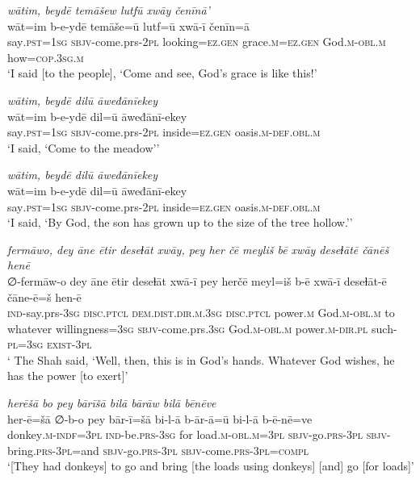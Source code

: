 \ea \label{ZQ.46}
\textit{wātim, beydē temāšew lutfū xwāy čenīnā’} \\ 
\gll wāt=im b-e-ydē temāše=ū lutf=ū xwā-ī čenīn=ā \\ 
 say\textsc{.pst}\textsc{=\textsc{1sg}} \textsc{sbjv-}come.prs-\textsc{2pl} looking\textsc{=ez.gen} grace\textsc{.m}\textsc{=ez.gen} God\textsc{.m}\textsc{-obl}\textsc{.m} how\textsc{=cop}\textsc{.3sg}\textsc{.m} \\ 
\glt `I said [to the people], ‘Come and see, God’s grace is like this!'
\z 
 
\ea \label{ZQ.48}
\textit{wātim, beydē dilū āweđānīekey} \\ 
\gll wāt=im b-e-ydē dil=ū āweđānī-ekey \\ 
 say\textsc{.pst}\textsc{=\textsc{1sg}} \textsc{sbjv-}come.prs-\textsc{2pl} inside\textsc{=ez.gen} oasis\textsc{.m}\textsc{-def}\textsc{.obl}\textsc{.m} \\ 
\glt `I said, ‘Come to the meadow’'
\z 
 
\ea \label{ZQ.50}
\textit{wātim, beydē dilū āweđānīekey} \\ 
\gll wāt=im b-e-ydē dil=ū āweđānī-ekey \\ 
 say\textsc{.pst}\textsc{=\textsc{1sg}} \textsc{sbjv-}come.prs-\textsc{2pl} inside\textsc{=ez.gen} oasis\textsc{.m}\textsc{-def}\textsc{.obl}\textsc{.m} \\ 
\glt `I said, ‘By God, the son has grown up to the size of the tree hollow.’'
\z 
 
\ea \label{ZQ.55}
\textit{fermāwo, dey āne ētir deseɫāt xwāy, pey her čē meyliš bē xwāy deseɫātē čānēš henē} \\ 
\gll ∅-fermāw-o dey āne ētir deseɫāt xwā-ī pey herčē meyl=iš b-ē xwā-ī deseɫāt-ē čāne-ē=š hen-ē \\ 
 \textsc{ind-}say.prs\textsc{-3sg} \textsc{disc.ptcl} \textsc{dem.dist}\textsc{.dir}\textsc{.m}\textsc{.3sg} \textsc{disc.ptcl} power\textsc{.m} God\textsc{.m}\textsc{-obl}\textsc{.m} to whatever willingness\textsc{=3sg} \textsc{sbjv-}come.prs\textsc{.3sg} God\textsc{.m}\textsc{-obl}\textsc{.m} power\textsc{.m-dir.pl} such\textsc{-pl}\textsc{=3sg} \textsc{exist}\textsc{-3pl} \\ 
\glt ` The Shah said, ‘Well, then, this is in God’s hands. Whatever God wishes, he has the power [to exert]'
\z 
 
\ea \label{HB.9}
\textit{herēšā bo pey bārīšā bilā bārāw bilā bēnēve} \\ 
\gll her-ē=šā ∅-b-o pey bār-ī=šā bi-l-ā b-ār-ā=ū bi-l-ā b-ē-nē=ve \\ 
 donkey\textsc{.m}\textsc{-indf}\textsc{=3pl} \textsc{ind-}be\textsc{.prs}\textsc{-3sg} for load\textsc{.m}\textsc{-obl}\textsc{.m}\textsc{=3pl} \textsc{sbjv-}go\textsc{.prs}\textsc{-3pl} \textsc{sbjv-}bring\textsc{.prs}\textsc{-3pl}=and \textsc{sbjv-}go\textsc{.prs}\textsc{-3pl} \textsc{sbjv-}come\textsc{.prs}\textsc{-3pl}\textsc{=compl} \\ 
\glt `[They had donkeys] to go and bring [the loads using donkeys] [and] go [for loads]'
\z 
 
